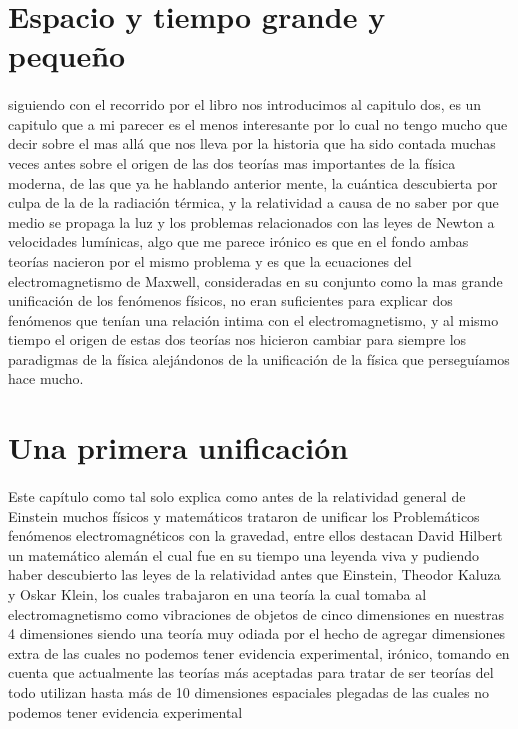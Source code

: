 \documentclass[12pt]{article}
\begin{document}
\section*{Espacio y tiempo grande y pequeño}
\paragraph*{}
\textsf{siguiendo con el recorrido por el libro nos introducimos al capitulo dos, es un capitulo que a mi parecer es el menos interesante
por lo cual no tengo mucho que decir sobre el mas allá que nos lleva por la historia que ha sido contada muchas veces antes sobre el origen
de las dos teorías mas importantes de la física moderna, de las que ya he hablando anterior mente, la cuántica descubierta por culpa de la 
de la radiación térmica, y la relatividad a causa de no saber por que medio se propaga la luz y los problemas relacionados con las leyes de 
Newton a velocidades lumínicas, algo que me parece irónico es que en el fondo ambas teorías nacieron por el mismo problema y es que la ecuaciones 
del electromagnetismo de Maxwell, consideradas en su conjunto como la mas grande unificación de los fenómenos físicos, no eran suficientes para
explicar dos fenómenos que tenían una relación intima con el electromagnetismo, y al mismo tiempo el origen de estas dos teorías nos hicieron 
cambiar para siempre los paradigmas de la física alejándonos de la unificación de la física que perseguíamos hace mucho.}
\section*{Una primera unificación}
\paragraph*{}
\textsf{Este capítulo como tal solo explica como antes de la relatividad general de Einstein muchos físicos y matemáticos trataron de unificar los
Problemáticos fenómenos electromagnéticos con la gravedad, entre ellos destacan David Hilbert un matemático alemán el cual fue en su tiempo
una leyenda viva y pudiendo haber descubierto las leyes de la relatividad antes que Einstein, Theodor Kaluza y Oskar Klein, los cuales trabajaron
en una teoría la cual tomaba al electromagnetismo como vibraciones de objetos de cinco dimensiones en nuestras 4 dimensiones siendo una teoría 
muy odiada por el hecho de agregar dimensiones extra de las cuales no podemos tener evidencia experimental, irónico, tomando en cuenta que actualmente
las teorías más aceptadas para tratar de ser teorías del todo utilizan hasta más de 10 dimensiones espaciales plegadas de las cuales no podemos
tener evidencia experimental}
\end{document}
